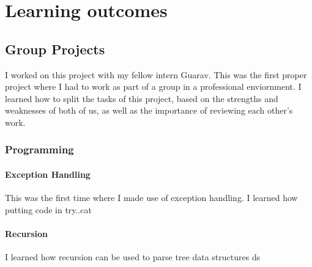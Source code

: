 \section{Learning outcomes}
    \subsection{Group Projects}
    I worked on this project with my fellow intern Guarav. This was the first proper project where I had to work as part of a group in a professional enviornment. I learned how to split the tasks of this project, based on the strengths and weaknesses of both of us, as well as the importance of reviewing each other's work.
    \subsubsection{Programming}
        \paragraph{Exception Handling}
        This was the first time where I made use of exception handling. I learned how putting code in try..cat
        \paragraph{Recursion}
        I learned how recursion can be used to parse tree data structures ds